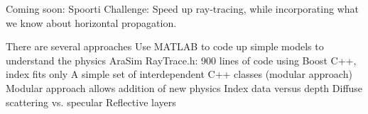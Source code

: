 \documentclass{beamer}
\begin{document}
\begin{frame}{Coming soon: Spoorti }
\small
Challenge: Speed up ray-tracing, while incorporating what we know about horizontal propagation.
\begin{outline}[enumerate]
\1 There are several approaches
\2 Use MATLAB to code up simple models to understand the physics
\2 AraSim RayTrace.h: 900 lines of code using Boost C++, index fits only
\2 A simple set of interdependent C++ classes (modular approach)
\1 Modular approach allows addition of new physics
\2 Index data versus depth
\2 Diffuse scattering vs. specular
\2 Reflective layers
\end{outline}
\end{frame}
\end{document}
